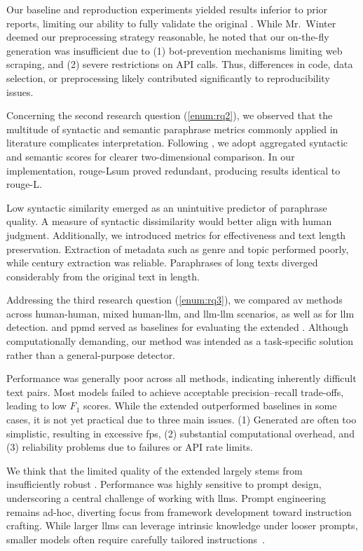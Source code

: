 Our baseline and reproduction experiments yielded results inferior to prior reports, limiting our ability to fully validate the original \impAppr{}. 
While Mr.~Winter deemed our preprocessing strategy reasonable, he noted that our on-the-fly \imp{} generation was insufficient due to (1) bot-prevention mechanisms limiting web scraping, and (2) severe restrictions on API calls. 
Thus, differences in code, data selection, or preprocessing likely contributed significantly to reproducibility issues.

Concerning the second research question (\autoref{enum:rq2}), we observed that the multitude of syntactic and semantic paraphrase metrics commonly applied in literature complicates interpretation. 
Following \citet{gohsen_captions_2023}, we adopt aggregated syntactic and semantic scores for clearer two-dimensional comparison. 
In our implementation, \ac{rouge}-Lsum proved redundant, producing results identical to \ac{rouge}-L.

Low syntactic similarity emerged as an unintuitive predictor of paraphrase quality.
A measure of syntactic dissimilarity would better align with human judgment. 
Additionally, we introduced metrics for \pextractor{} effectiveness and text length preservation. 
Extraction of metadata such as genre and topic performed poorly, while century extraction was reliable. 
Paraphrases of long \dataGutenberg{} texts diverged considerably from the original text in length.

Addressing the third research question (\autoref{enum:rq3}), we compared \ac{av} methods across human-human, mixed human-\ac{llm}, and \ac{llm}-\ac{llm} scenarios, as well as for \ac{llm} detection. 
\unmasking{} and \ac{ppmd} served as baselines for evaluating the extended \impAppr{}. 
Although computationally demanding, our method was intended as a task-specific solution rather than a general-purpose detector. 

Performance was generally poor across all methods, indicating inherently difficult text pairs. 
Most models failed to achieve acceptable precision–recall trade-offs, leading to low $F_1$ scores. 
While the extended \impAppr{} outperformed baselines in some cases, it is not yet practical due to three main issues. 
(1) Generated \imps{} are often too simplistic, resulting in excessive \acp{fp}, (2) substantial computational overhead, and (3) reliability problems due to \pgenerator{} failures or API rate limits.

We think that the limited quality of the extended \impAppr{} largely stems from insufficiently robust \imps{}. 
Performance was highly sensitive to prompt design, underscoring a central challenge of working with \acp{llm}. 
Prompt engineering remains ad-hoc, diverting focus from framework development toward instruction crafting. 
While larger \acp{llm} can leverage intrinsic knowledge under looser prompts, smaller models often require carefully tailored instructions~\citep{schmidt_llm_av_latin_24}. 

